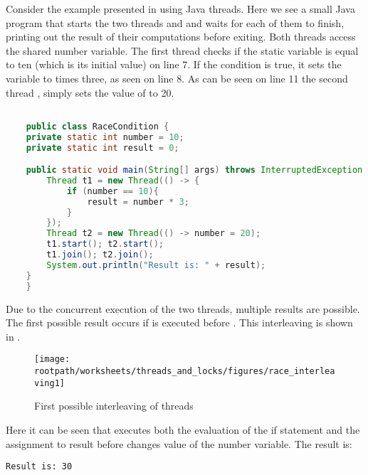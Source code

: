 Consider the example presented in  using Java threads. Here we see a small Java program that starts the two threads  and  and waits for each of them to finish, printing out the result of their computations before exiting. Both threads access the shared number variable. The first thread  checks if the static variable  is equal to ten (which is its initial value) on line 7. If the condition is true, it sets the  variable to  times three, as seen on line 8. As can be seen on line 11 the second thread , simply sets the value of  to 20.

\begin{lstlisting}[label=lst:racecondition,
  caption={Race condition example},
  language=Java,  
  showspaces=false,
  showtabs=false,
  breaklines=true,
  showstringspaces=false,
  breakatwhitespace=true,
  commentstyle=\color{greencomments},
  keywordstyle=\color{bluekeywords},
  stringstyle=\color{redstrings}]  % Start your code-block

	public class RaceCondition {
    private static int number = 10;
    private static int result = 0;

    public static void main(String[] args) throws InterruptedException {
        Thread t1 = new Thread(() -> {
            if (number == 10){
                result = number * 3;
            }
        });
        Thread t2 = new Thread(() -> number = 20);
        t1.start(); t2.start();
        t1.join(); t2.join();
        System.out.println("Result is: " + result);
    }
	}
\end{lstlisting}

Due to the concurrent execution of the two threads, multiple results are possible. The first possible result occurs if  is executed before . This interleaving is shown in . 

\begin{figure}[htbp]
\centering
 \texttt{[image: \\rootpath/worksheets/threads\_and\_locks/figures/race\_interleaving1]} 
 \caption{First possible interleaving of threads}
\label{fig:race_interleaving1}
\end{figure}

Here it can be seen that  executes both the evaluation of the if statement and the assignment to result before  changes value of the number variable. The result is:
\begin{verbatim}
Result is: 30
\end{verbatim}

